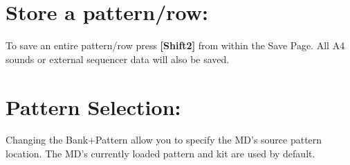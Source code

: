 \section{Store a pattern/row:}
To save an entire pattern/row press \textbf{[Shift2]} from within the Save Page. All A4 sounds or external sequencer data will also be saved.

\section{Pattern Selection:}

Changing the Bank+Pattern allow you to specify the MD's source pattern location. The MD’s currently loaded pattern and kit are used by default.
